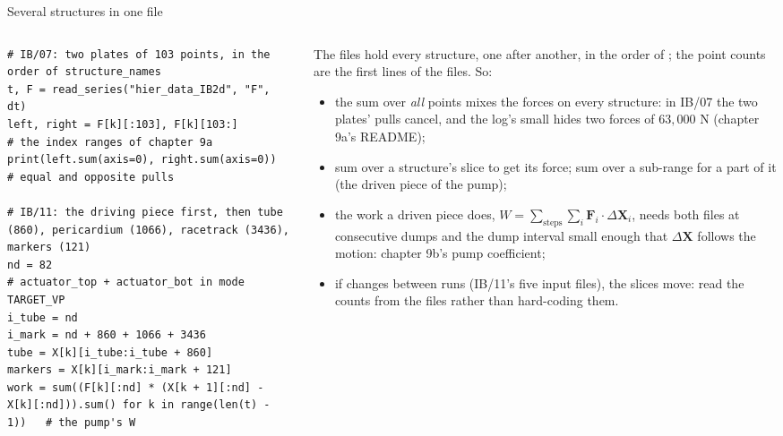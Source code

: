 \documentclass[aspectratio=169,11pt]{beamer}
\begin{document}
\begin{frame}[fragile]{Several structures in one file}
\label{fr:structures}
\begin{columns}[T,onlytextwidth]
\begin{column}{0.52\textwidth}
\begin{lstlisting}[style=pythontiny]
# IB/07: two plates of 103 points, in the order of structure_names
t, F = read_series("hier_data_IB2d", "F", dt)
left, right = F[k][:103], F[k][103:]             # the index ranges of chapter 9a
print(left.sum(axis=0), right.sum(axis=0))       # equal and opposite pulls

# IB/11: the driving piece first, then tube (860), pericardium (1066), racetrack (3436), markers (121)
nd = 82                                          # actuator_top + actuator_bot in mode TARGET_VP
i_tube = nd
i_mark = nd + 860 + 1066 + 3436
tube = X[k][i_tube:i_tube + 860]
markers = X[k][i_mark:i_mark + 121]
work = sum((F[k][:nd] * (X[k + 1][:nd] - X[k][:nd])).sum() for k in range(len(t) - 1))   # the pump's W
\end{lstlisting}
\end{column}
\begin{column}{0.46\textwidth}
\scriptsize The files hold every structure, one after another, in the order of ; the point counts are the first lines of the  files. So:
\begin{itemize}
  \item the sum over \emph{all} points mixes the forces on every structure: in IB/07 the two plates' pulls cancel, and the log's small  hides two forces of $63{,}000$ N (chapter 9a's README);
  \item sum over a structure's slice to get its force; sum over a sub-range for a part of it (the driven piece of the pump);
  \item the work a driven piece does, $W = \sum_{\mathrm{steps}}\sum_i \mathbf{F}_i\cdot\Delta\mathbf{X}_i$, needs both files at consecutive dumps and the dump interval small enough that $\Delta\mathbf{X}$ follows the motion: chapter 9b's pump coefficient;
  \item if  changes between runs (IB/11's five input files), the slices move: read the counts from the  files rather than hard-coding them.
\end{itemize}
\end{column}
\end{columns}
\end{frame}
\end{document}
